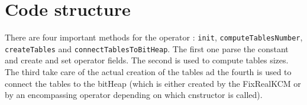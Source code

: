 \documentclass[10pt, a4paper, twocolumn]{article}
\begin{document}
\section{Code structure}
There are four important methods for the operator : \texttt{init}, \texttt{computeTablesNumber}, \texttt{createTables} and \texttt{connectTablesToBitHeap}. The first one parse the constant and create and set operator fields. The second is used to compute tables sizes. The third take care of the actual creation of the tables ad the fourth is used to connect the tables to the bitHeap (which is either created by the FixRealKCM or by an encompassing operator depending on which cnstructor is called). 
\end{document}
